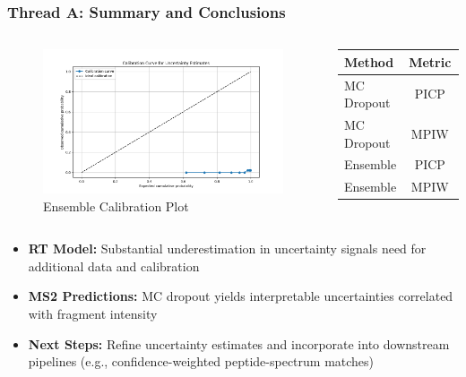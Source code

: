 \documentclass{beamer}
\begin{document}
\begin{frame}
  \frametitle{Thread A: Summary and Conclusions}
  \begin{columns}
      \begin{figure}
        \includegraphics[width=0.95\linewidth]{reports/ensemble_calibration.png}
        \caption{Ensemble Calibration Plot}
      \end{figure}
      \begin{tabular}{@{}lccc@{}}
        \toprule
        \textbf{Method} & \textbf{Metric} & \textbf{RT} & \textbf{MS2} \\
        \midrule
        MC Dropout & PICP   & 0.0213 & -- \\
        MC Dropout & MPIW   & 0.1905 & 0.0313 \\
        Ensemble   & PICP   & 0.0213 & -- \\
        Ensemble   & MPIW   & 0.2464 & $\sim 0$ \\
        \bottomrule
      \end{tabular}
  \end{columns}
  \begin{itemize}
    \item \textbf{RT Model:} Substantial underestimation in uncertainty signals need for additional data and calibration
    \item \textbf{MS2 Predictions:} MC dropout yields interpretable uncertainties correlated with fragment intensity
    \item \textbf{Next Steps:} Refine uncertainty estimates and incorporate into downstream pipelines (e.g., confidence-weighted peptide-spectrum matches)
  \end{itemize}
\end{frame}
\end{document}
